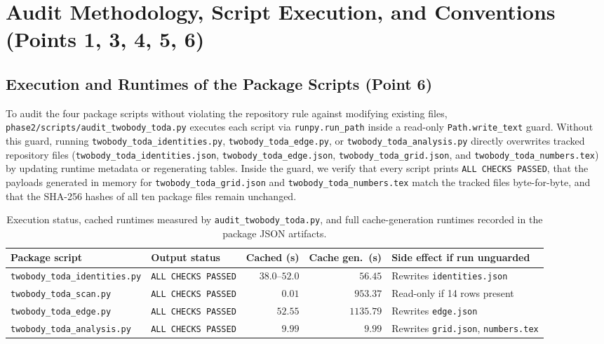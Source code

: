\documentclass[11pt,a4paper]{article}
\begin{document}
\section{Audit Methodology, Script Execution, and Conventions (Points 1, 3, 4, 5, 6)}

\subsection{Execution and Runtimes of the Package Scripts (Point 6)}

To audit the four package scripts without violating the repository rule against modifying existing files, \texttt{phase2/scripts/audit\_twobody\_toda.py} executes each script via \texttt{runpy.run\_path} inside a read-only \texttt{Path.write\_text} guard. Without this guard, running \texttt{twobody\_toda\_identities.py}, \texttt{twobody\_toda\_edge.py}, or \texttt{twobody\_toda\_analysis.py} directly overwrites tracked repository files (\texttt{twobody\_toda\_identities.json}, \texttt{twobody\_toda\_edge.json}, \texttt{twobody\_toda\_grid.json}, and \texttt{twobody\_toda\_numbers.tex}) by updating runtime metadata or regenerating tables. Inside the guard, we verify that every script prints \texttt{ALL CHECKS PASSED}, that the payloads generated in memory for \texttt{twobody\_toda\_grid.json} and \texttt{twobody\_toda\_numbers.tex} match the tracked files byte-for-byte, and that the SHA-256 hashes of all ten package files remain unchanged.

\begin{table}[ht!]
\centering
\small
\caption{Execution status, cached runtimes measured by \texttt{audit\_twobody\_toda.py}, and full cache-generation runtimes recorded in the package JSON artifacts.}
\label{tab:runtimes}
\begin{tabular}{@{}llrrl@{}}
\toprule
\textbf{Package script} & \textbf{Output status} & \textbf{Cached (s)} & \textbf{Cache gen.\ (s)} & \textbf{Side effect if run unguarded} \\
\midrule
\texttt{twobody\_toda\_identities.py} & \texttt{ALL CHECKS PASSED} & $38.0\text{--}52.0$ & $56.45$ & Rewrites \texttt{identities.json} \\
\texttt{twobody\_toda\_scan.py} & \texttt{ALL CHECKS PASSED} & $0.01$ & $953.37$ & Read-only if 14 rows present \\
\texttt{twobody\_toda\_edge.py} & \texttt{ALL CHECKS PASSED} & $52.55$ & $1135.79$ & Rewrites \texttt{edge.json} \\
\texttt{twobody\_toda\_analysis.py} & \texttt{ALL CHECKS PASSED} & $9.99$ & $9.99$ & Rewrites \texttt{grid.json}, \texttt{numbers.tex} \\
\bottomrule
\end{tabular}
\end{table}
\end{document}
